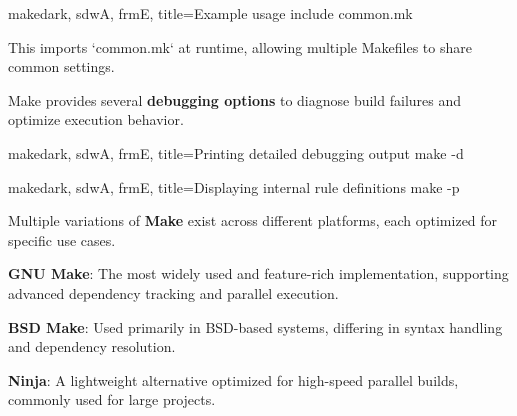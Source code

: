 \begin{NxCodeBox}{make}{dark, sdwA, frmE, title={Example usage}}
	include common.mk
\end{NxCodeBox}

\bigskip

\begin{NxSSSSBox}[breakable]
	\begin{NxIDBox}
		This imports `common.mk` at runtime, allowing multiple Makefiles to share common settings.
	\end{NxIDBox}
\end{NxSSSSBox}

\begin{NxSSSSBox}
	\begin{NxIDBox}
		Make provides several \textbf{debugging options} to diagnose build failures and optimize execution behavior.
	\end{NxIDBox}
\end{NxSSSSBox}

\begin{NxCodeBox}{make}{dark, sdwA, frmE, title={Printing detailed debugging output}}
	make -d
\end{NxCodeBox}

\bigskip

\begin{NxCodeBox}{make}{dark, sdwA, frmE, title={Displaying internal rule definitions}}
	make -p
\end{NxCodeBox}

\begin{NxSSSSBox}
	\begin{NxIDBox}
		Multiple variations of \textbf{Make} exist across different platforms, each optimized for specific use cases.
	\end{NxIDBox}
	\begin{NxIDBox}
		\textbf{GNU Make}: The most widely used and feature-rich implementation, supporting advanced dependency tracking and parallel execution.
	\end{NxIDBox}
	\begin{NxIDBox}
		\textbf{BSD Make}: Used primarily in BSD-based systems, differing in syntax handling and dependency resolution.
	\end{NxIDBox}
	\begin{NxIDBox}
		\textbf{Ninja}: A lightweight alternative optimized for high-speed parallel builds, commonly used for large projects.
	\end{NxIDBox}
\end{NxSSSSBox}

